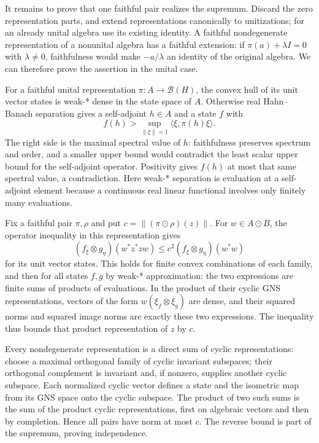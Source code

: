 \documentclass[
  11pt,
]{article}
\begin{document}
It remains to prove that one faithful pair realizes the supremum.
Discard the zero representation parts, and extend representations
canonically to unitizations; for an already unital algebra use its
existing identity. A faithful nondegenerate representation of a
nonunital algebra has a faithful extension: if \(\pi(a)+\lambda I=0\)
with \(\lambda\ne0\), faithfulness would make \(-a/\lambda\) an identity
of the original algebra. We can therefore prove the assertion in the
unital case.

For a faithful unital representation \(\pi:A\to\mathcal B(H)\), the
convex hull of its unit vector states is weak-* dense in the state space
of \(A\). Otherwise real Hahn--Banach separation gives a self-adjoint
\(h\in A\) and a state \(f\) with \[
f(h)>\sup_{\|\xi\|=1}\langle\xi,\pi(h)\xi\rangle.
\] The right side is the maximal spectral value of \(h\): faithfulness
preserves spectrum and order, and a smaller upper bound would contradict
the least scalar upper bound for the self-adjoint operator. Positivity
gives \(f(h)\) at most that same spectral value, a contradiction. Here
weak-* separation is evaluation at a self-adjoint element because a
continuous real linear functional involves only finitely many
evaluations.

Fix a faithful pair \(\pi,\rho\) and put \(c=\|(\pi\odot\rho)(z)\|\).
For \(w\in A\odot B\), the operator inequality in this representation
gives \[
(f_\xi\otimes g_\eta)(w^*z^*zw)
\leq c^2(f_\xi\otimes g_\eta)(w^*w)
\] for its unit vector states. This holds for finite convex combinations
of each family, and then for all states \(f,g\) by weak-* approximation:
the two expressions are finite sums of products of evaluations. In the
product of their cyclic GNS representations, vectors of the form
\(w(\xi_f\otimes\xi_g)\) are dense, and their squared norms and squared
image norms are exactly these two expressions. The inequality thus
bounds that product representation of \(z\) by \(c\).

Every nondegenerate representation is a direct sum of cyclic
representations: choose a maximal orthogonal family of cyclic invariant
subspaces; their orthogonal complement is invariant and, if nonzero,
supplies another cyclic subspace. Each normalized cyclic vector defines
a state and the isometric map from its GNS space onto the cyclic
subspace. The product of two such sums is the sum of the product cyclic
representations, first on algebraic vectors and then by completion.
Hence all pairs have norm at most \(c\). The reverse bound is part of
the supremum, proving independence.
\end{document}
